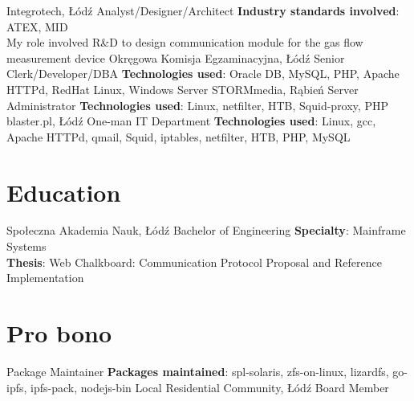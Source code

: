 \documentclass[%
               doublesided,
               paper=a4,
               fontsize=10pt
              ]{my-resume}
\begin{document}
{{        %
        }
        {Integrotech, Łódź}
        {Analyst/Designer/Architect}
        {{\bfseries Industry standards involved}: ATEX, MID\\
        My role involved R\&D
        to design
        communication module for the
        gas flow measurement device
        }
        {Okręgowa Komisja Egzaminacyjna, Łódź}
        {Senior Clerk/Developer/DBA}
        {{\bfseries Technologies used}: Oracle DB, MySQL, PHP, Apache HTTPd, RedHat Linux, Windows Server}
        {STORMmedia, Rąbień}
        {Server Administrator}
        {{\bfseries Technologies used}: Linux, netfilter, HTB, Squid-proxy, PHP}
        {blaster.pl, Łódź}
        {One-man IT Department}
        {{\bfseries Technologies used}: Linux, gcc, Apache HTTPd, qmail, Squid, iptables, netfilter, HTB, PHP, MySQL}
    
    \section[\faMortarBoard]{Education}
        {Społeczna Akademia Nauk, Łódź}
        {Bachelor of Engineering}
        {
            {\bfseries Specialty}: Mainframe Systems\\
            {\bfseries Thesis}: Web Chalkboard: Communication Protocol Proposal and Reference Implementation
        }

    \section[\faChild]{Pro bono}
        {Package Maintainer}
        {{\bfseries Packages maintained}: spl-solaris, zfs-on-linux, lizardfs, go-ipfs, ipfs-pack, nodejs-bin}
        {Local Residential Community, Łódź}
        {Board Member}
        {}

}
\end{document}
